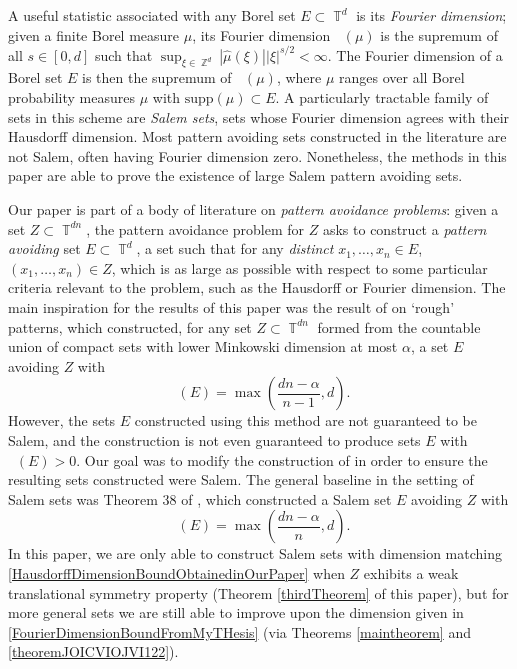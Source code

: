 \documentclass[dvipsnames,letterpaper,12pt]{article}
\numberwithin{equation}{section}
\DeclareMathOperator{\hausdim}{\dim_{\mathbb{H}}}
\DeclareMathOperator{\fordim}{\dim_{\mathbb{F}}}
\DeclareMathOperator{\ZZ}{\mathbb{Z}}
\DeclareMathOperator{\TT}{\mathbb{T}}
\numberwithin{theorem}{section}
\begin{document}

A useful statistic associated with any Borel set $E \subset \TT^d$ is its \emph{Fourier dimension}; given a finite Borel measure $\mu$, its Fourier dimension $\fordim(\mu)$ is the supremum of all $s \in [0,d]$ such that $\sup_{\xi \in \ZZ^d} |\widehat{\mu}(\xi)| |\xi|^{s/2} < \infty$. The Fourier dimension of a Borel set $E$ is then the supremum of $\fordim(\mu)$, where $\mu$ ranges over all Borel probability measures $\mu$ with $\text{supp}(\mu) \subset E$. A particularly tractable family of sets in this scheme are \emph{Salem sets}, sets whose Fourier dimension agrees with their Hausdorff dimension. Most pattern avoiding sets constructed in the literature are not Salem, often having Fourier dimension zero. Nonetheless, the methods in this paper are able to prove the existence of large Salem pattern avoiding sets.

Our paper is part of a body of literature on \emph{pattern avoidance problems}: given a set $Z \subset \TT^{dn}$, the pattern avoidance problem for $Z$ asks to construct a \emph{pattern avoiding} set $E \subset \TT^d$, a set such that for any \emph{distinct} $x_1,\dots,x_n \in E$, $(x_1,\dots,x_n) \in Z$, which is as large as possible with respect to some particular criteria relevant to the problem, such as the Hausdorff or Fourier dimension. The main inspiration for the results of this paper was the result of \cite{OurPaper} on `rough' patterns, which constructed, for any set $Z \subset \TT^{dn}$ formed from the countable union of compact sets with lower Minkowski dimension at most $\alpha$, a set $E$ avoiding $Z$ with
%
\begin{equation} \label{HausdorffDimensionBoundObtainedinOurPaper}
    \hausdim(E) = \max\left( \frac{dn - \alpha}{n - 1}, d \right).
\end{equation}
%
However, the sets $E$ constructed using this method are not guaranteed to be Salem, and the construction is not even guaranteed to produce sets $E$ with $\fordim(E) > 0$. Our goal was to modify the construction of \cite{OurPaper} in order to ensure the resulting sets constructed were Salem. The general baseline in the setting of Salem sets was Theorem 38 of \cite{MyThesis}, which constructed a Salem set $E$ avoiding $Z$ with
%
\begin{equation} \label{FourierDimensionBoundFromMyTHesis}
    \fordim(E) = \max \left( \frac{dn - \alpha}{n}, d \right).
\end{equation}
%
In this paper, we are only able to construct Salem sets with dimension matching \eqref{HausdorffDimensionBoundObtainedinOurPaper} when $Z$ exhibits a weak translational symmetry property (Theorem \ref{thirdTheorem} of this paper), but for more general sets we are still able to improve upon the dimension given in \eqref{FourierDimensionBoundFromMyTHesis} (via Theorems \ref{maintheorem} and \ref{theoremJOICVIOJVI122}).
\end{document}
